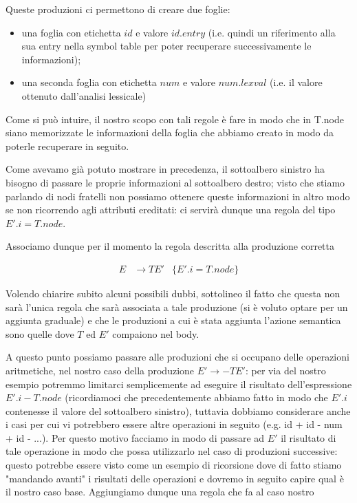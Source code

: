 \documentclass[class=book, crop=false, oneside, 12pt]{standalone}
\begin{document}
Queste produzioni ci permettono di creare due foglie:

\begin{itemize}
    \item una foglia con etichetta \(id\) e valore \(id.entry\) (i.e. quindi un riferimento alla sua entry nella symbol table per poter recuperare successivamente le informazioni);
    \item una seconda foglia con etichetta \(num\) e valore \(num.lexval\) (i.e. il valore ottenuto dall'analisi lessicale)
\end{itemize}

Come si può intuire, il nostro scopo con tali regole è fare in modo che in T.node siano memorizzate le informazioni della foglia che abbiamo creato in modo da poterle recuperare in seguito.

Come avevamo già potuto mostrare in precedenza, il sottoalbero sinistro ha bisogno di passare le proprie informazioni al sottoalbero destro; visto che stiamo parlando di nodi fratelli non possiamo ottenere queste informazioni in altro modo se non ricorrendo agli attributi ereditati: ci servirà dunque una regola del tipo \(E'.i = T.node\).

Associamo dunque per il momento la regola descritta alla produzione corretta 

\begin{align*}
    E &\to TE' &\{E'.i = T.node\}
\end{align*}

Volendo chiarire subito alcuni possibili dubbi, sottolineo il fatto che questa non sarà l'unica regola che sarà associata a tale produzione (si è voluto optare per un aggiunta graduale) e che le produzioni a cui è stata aggiunta l'azione semantica sono quelle dove \(T\) ed \(E'\) compaiono nel body.

A questo punto possiamo passare alle produzioni che si occupano delle operazioni aritmetiche, nel nostro caso della produzione \(E' \to -TE'\): per via del nostro esempio potremmo limitarci semplicemente ad eseguire il risultato dell'espressione \(E'.i - T.node\) (ricordiamoci che precedentemente abbiamo fatto in modo che \(E'.i\) contenesse il valore del sottoalbero sinistro), tuttavia dobbiamo considerare anche i casi per cui vi potrebbero essere altre operazioni in seguito (e.g. id + id - num + id - ...). Per questo motivo facciamo in modo di passare ad \(E'\) il risultato di tale operazione in modo che possa utilizzarlo nel caso di produzioni successive: questo potrebbe essere visto come un esempio di ricorsione dove di fatto stiamo "mandando avanti" i risultati delle operazioni e dovremo in seguito capire qual è il nostro caso base. Aggiungiamo dunque una regola che fa al caso nostro 
\end{document}
